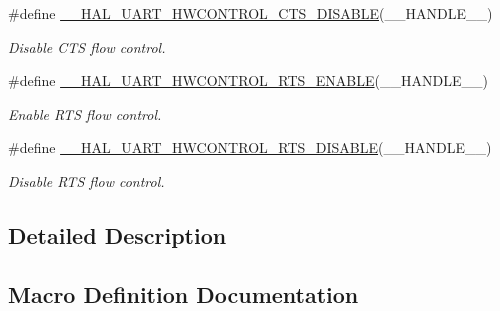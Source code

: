 \begin{DoxyCompactItemize}
\#define \hyperlink{group___u_a_r_t___exported___macros_ga0a26cb3a576c2700f76a7c697c86a499}{\+\_\+\+\_\+\+H\+A\+L\+\_\+\+U\+A\+R\+T\+\_\+\+H\+W\+C\+O\+N\+T\+R\+O\+L\+\_\+\+C\+T\+S\+\_\+\+D\+I\+S\+A\+B\+LE}(\+\_\+\+\_\+\+H\+A\+N\+D\+L\+E\+\_\+\+\_\+)
\begin{DoxyCompactList}\small\item\em Disable C\+TS flow control. \end{DoxyCompactList}\item 
\#define \hyperlink{group___u_a_r_t___exported___macros_ga017ec9001ff33136f87cc4034b2709a6}{\+\_\+\+\_\+\+H\+A\+L\+\_\+\+U\+A\+R\+T\+\_\+\+H\+W\+C\+O\+N\+T\+R\+O\+L\+\_\+\+R\+T\+S\+\_\+\+E\+N\+A\+B\+LE}(\+\_\+\+\_\+\+H\+A\+N\+D\+L\+E\+\_\+\+\_\+)
\begin{DoxyCompactList}\small\item\em Enable R\+TS flow control. \end{DoxyCompactList}\item 
\#define \hyperlink{group___u_a_r_t___exported___macros_ga8c034e96ad8f263cafeb5898ff7311fd}{\+\_\+\+\_\+\+H\+A\+L\+\_\+\+U\+A\+R\+T\+\_\+\+H\+W\+C\+O\+N\+T\+R\+O\+L\+\_\+\+R\+T\+S\+\_\+\+D\+I\+S\+A\+B\+LE}(\+\_\+\+\_\+\+H\+A\+N\+D\+L\+E\+\_\+\+\_\+)
\begin{DoxyCompactList}\small\item\em Disable R\+TS flow control. \end{DoxyCompactList}\end{DoxyCompactItemize}


\subsection{Detailed Description}


\subsection{Macro Definition Documentation}
\mbox{\label{group___u_a_r_t___exported___macros_gae1dfc7777b089a10464841045b524caa}} 

